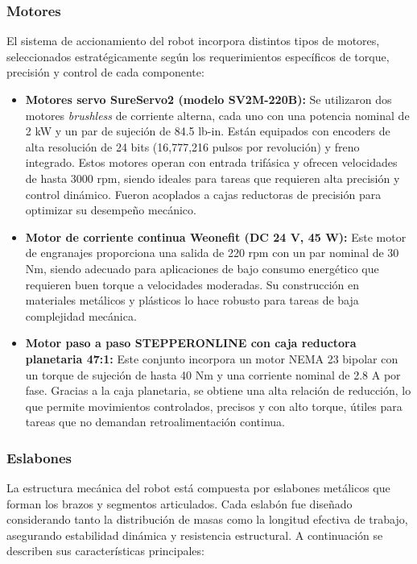 \subsubsection{Motores} \label{subsubsec:motores}

El sistema de accionamiento del robot incorpora distintos tipos de motores, seleccionados estratégicamente según los requerimientos específicos de torque, precisión y control de cada componente:

\begin{itemize}
	\item \textbf{Motores servo SureServo2 (modelo SV2M-220B):} Se utilizaron dos motores \textit{brushless} de corriente alterna, cada uno con una potencia nominal de 2 kW y un par de sujeción de 84.5 lb-in. Están equipados con encoders de alta resolución de 24 bits (16,777,216 pulsos por revolución) y freno integrado. Estos motores operan con entrada trifásica y ofrecen velocidades de hasta 3000 rpm, siendo ideales para tareas que requieren alta precisión y control dinámico. Fueron acoplados a cajas reductoras de precisión para optimizar su desempeño mecánico.
	
	\item \textbf{Motor de corriente continua Weonefit (DC 24 V, 45 W):} Este motor de engranajes proporciona una salida de 220 rpm con un par nominal de 30 Nm, siendo adecuado para aplicaciones de bajo consumo energético que requieren buen torque a velocidades moderadas. Su construcción en materiales metálicos y plásticos lo hace robusto para tareas de baja complejidad mecánica.
	
	\item \textbf{Motor paso a paso STEPPERONLINE con caja reductora planetaria 47:1:} Este conjunto incorpora un motor NEMA 23 bipolar con un torque de sujeción de hasta 40 Nm y una corriente nominal de 2.8 A por fase. Gracias a la caja planetaria, se obtiene una alta relación de reducción, lo que permite movimientos controlados, precisos y con alto torque, útiles para tareas que no demandan retroalimentación continua.
\end{itemize}


\subsubsection{Eslabones} \label{subsubsec:eslabones}

La estructura mecánica del robot está compuesta por eslabones metálicos que forman los brazos y segmentos articulados. Cada eslabón fue diseñado considerando tanto la distribución de masas como la longitud efectiva de trabajo, asegurando estabilidad dinámica y resistencia estructural. A continuación se describen sus características principales:

